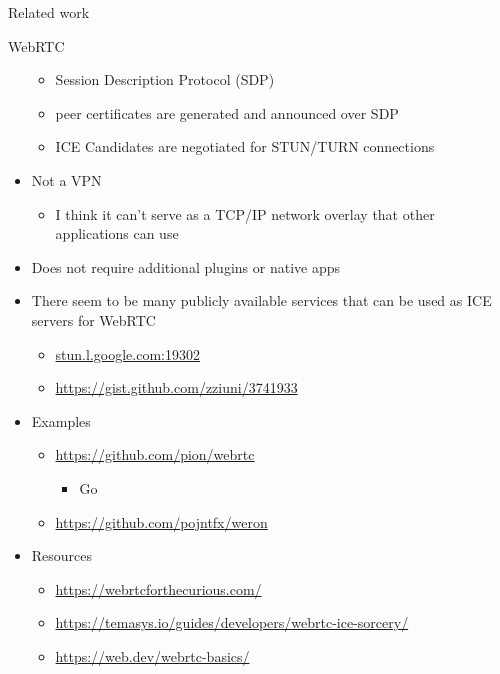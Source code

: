 \begin{frame}[fragile]{Related work}
\begin{block}{WebRTC}
\begin{itemize}
  \begin{itemize}
  \tightlist
  \item
    Session Description Protocol (SDP)
  \item
    peer certificates are generated and announced over SDP
  \item
    ICE Candidates are negotiated for STUN/TURN connections
  \end{itemize}
\item
  Not a VPN

  \begin{itemize}
  \tightlist
  \item
    I think it can't serve as a TCP/IP network overlay that other
    applications can use
  \end{itemize}
\item
  Does not require additional plugins or native apps
\item
  There seem to be many publicly available services that can be used as
  ICE servers for WebRTC

  \begin{itemize}
  \tightlist
  \item
    \href{http://stun.l.google.com:19302/}{stun.l.google.com:19302}
  \item
    \url{https://gist.github.com/zziuni/3741933}
  \end{itemize}
\item
  Examples

  \begin{itemize}
  \tightlist
  \item
    \url{https://github.com/pion/webrtc}

    \begin{itemize}
    \tightlist
    \item
      Go
    \end{itemize}
  \item
    \url{https://github.com/pojntfx/weron}
  \end{itemize}
\item
  Resources

  \begin{itemize}
  \tightlist
  \item
    \url{https://webrtcforthecurious.com/}
  \item
    \url{https://temasys.io/guides/developers/webrtc-ice-sorcery/}
  \item
    \href{https://web.dev/webrtc-basics/\#toc-rtcpeerconnection}{https://web.dev/webrtc-basics/}
  \end{itemize}
\end{itemize}
\end{block}


\end{frame}
